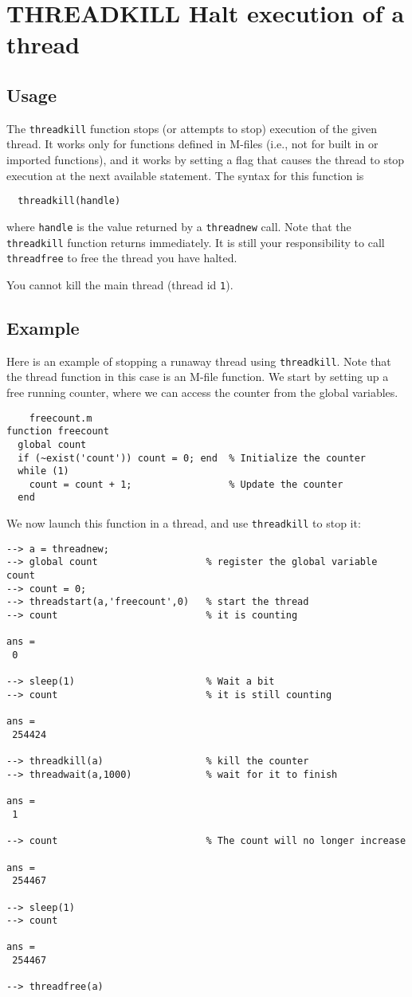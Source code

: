 \section{THREADKILL Halt execution of a thread}

\subsection{Usage}

The \verb|threadkill| function stops (or attempts to stop) execution
of the given thread.  It works only for functions defined in M-files
(i.e., not for built in or imported functions), and it works by 
setting a flag that causes the thread to stop execution at the next
available statement.  The syntax for this function is 
\begin{verbatim}
  threadkill(handle)
\end{verbatim}
where \verb|handle| is the value returned by a \verb|threadnew| call.  
Note that the \verb|threadkill| function returns immediately.  It 
is still your responsibility to call \verb|threadfree| to free
the thread you have halted.

You cannot kill the main thread (thread id \verb|1|).
\subsection{Example}

Here is an example of stopping a runaway thread using \verb|threadkill|.
Note that the thread function in this case is an M-file function.
We start by setting up a free running counter, where we can access 
the counter from the global variables.  
\begin{verbatim}
    freecount.m
function freecount
  global count
  if (~exist('count')) count = 0; end  % Initialize the counter
  while (1)
    count = count + 1;                 % Update the counter
  end
\end{verbatim}
We now launch this function in a thread, and use \verb|threadkill| to
stop it:
\begin{verbatim}
--> a = threadnew;
--> global count                   % register the global variable count
--> count = 0;
--> threadstart(a,'freecount',0)   % start the thread
--> count                          % it is counting

ans = 
 0 

--> sleep(1)                       % Wait a bit
--> count                          % it is still counting

ans = 
 254424 

--> threadkill(a)                  % kill the counter
--> threadwait(a,1000)             % wait for it to finish

ans = 
 1 

--> count                          % The count will no longer increase

ans = 
 254467 

--> sleep(1)
--> count

ans = 
 254467 

--> threadfree(a)
\end{verbatim}
